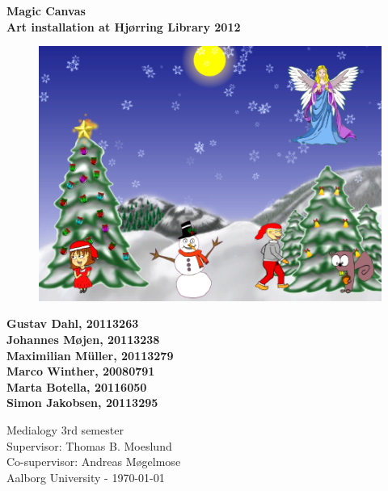 \thispagestyle{empty} %
\hspace{6cm} \vspace{0.1cm}
\begin{center}
\textbf{\Huge {Magic Canvas}\\ \vspace{1cm}
\huge{Art installation at Hj{\o}rring Library 2012}}
\begin{figure} [H]
\includegraphics[width=1.0\textwidth]{Pictures/Design/frontPage}
\centering
\label{building_diagonal_edge}
\end{figure}
\end{center}
\begin{center}
\Large{\textbf{Gustav Dahl, 20113263 \\ Johannes M{\o}jen, 20113238
\\ Maximilian M\"uller, 20113279 \\ Marco Winther, 20080791 \\ Marta Botella, 20116050
\\ Simon Jakobsen, 20113295}}
\end{center}
\vfill
Medialogy 3rd semester\\
Supervisor: Thomas B. Moeslund\\
Co-supervisor: Andreas M{\o}gelmose\\
Aalborg University - \today
